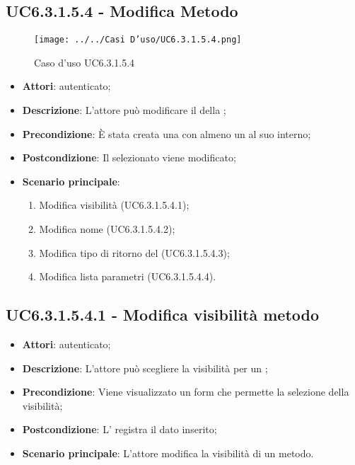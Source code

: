 \subsection{UC6.3.1.5.4 - Modifica Metodo}
\label{ssec:UC6.3.1.5.4}
\begin{figure}[h!]
\centering
\texttt{[image: ../../Casi D'uso/UC6.3.1.5.4.png]}
\caption{Caso d'uso UC6.3.1.5.4}
 \end{figure}
\begin{itemize}
\item \textbf{Attori}:  autenticato;
\item \textbf{Descrizione}: L'attore può modificare il  della ;
\item \textbf{Precondizione}: È stata creata una  con almeno un  al suo interno;
\item \textbf{Postcondizione}: Il  selezionato viene modificato;
\item \textbf{Scenario principale}: \begin{enumerate}\item Modifica visibilità  (UC6.3.1.5.4.1);\item Modifica nome  (UC6.3.1.5.4.2);\item Modifica tipo di ritorno del  (UC6.3.1.5.4.3);\item Modifica lista parametri  (UC6.3.1.5.4.4).
 \end{enumerate}
\end{itemize}
\subsection{UC6.3.1.5.4.1 - Modifica visibilità metodo}
\label{ssec:UC6.3.1.5.4.1}
\begin{itemize}
\item \textbf{Attori}:  autenticato;
\item \textbf{Descrizione}: L'attore può scegliere la visibilità per un ;
\item \textbf{Precondizione}: Viene visualizzato un form che permette la selezione della visibilità;
\item \textbf{Postcondizione}: L' registra il dato inserito;
\item \textbf{Scenario principale}: L'attore modifica la visibilità di un metodo.
\end{itemize}

